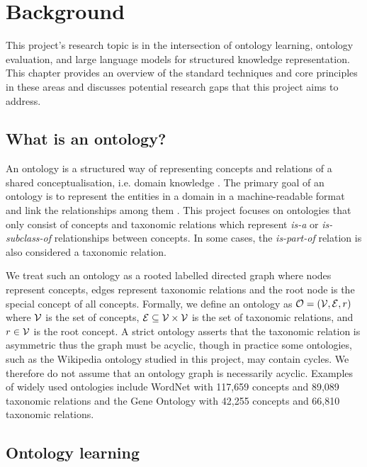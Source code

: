 \chapter{Background}

This project's research topic is in the intersection of ontology learning, ontology evaluation, and large language models for structured knowledge representation. This chapter provides an overview of the standard techniques and core principles in these areas and discusses potential research gaps that this project aims to address.

\section{What is an ontology?}

An ontology is a structured way of representing concepts and relations of a shared conceptualisation, i.e. domain knowledge \cite{gruber1995toward,gruber1993translation}. The primary goal of an ontology is to represent the entities in a domain in a machine-readable format and link the relationships among them \cite{national2022ontologies}. This project focuses on ontologies that only consist of concepts and taxonomic relations which represent \emph{is-a} or \emph{is-subclass-of} relationships between concepts. In some cases, the \emph{is-part-of} relation is also considered a taxonomic relation.

We treat such an ontology as a rooted labelled directed graph where nodes represent concepts, edges represent taxonomic relations and the root node is the special concept of all concepts. Formally, we define an ontology as $\mathcal{O} = (\mathcal{V}, \mathcal{E}, r)$ where $\mathcal{V}$ is the set of concepts, $\mathcal{E} \subseteq \mathcal{V} \times \mathcal{V}$ is the set of taxonomic relations, and $r \in \mathcal{V}$ is the root concept. A strict ontology asserts that the taxonomic relation is asymmetric thus the graph must be acyclic, though in practice some ontologies, such as the Wikipedia ontology studied in this project, may contain cycles. We therefore do not assume that an ontology graph is necessarily acyclic. Examples of widely used ontologies include WordNet \cite{miller1995wordnet} with 117,659 concepts and 89,089 taxonomic relations and the Gene Ontology \cite{ashburner2000gene} with 42,255 concepts and 66,810 taxonomic relations.

\section{Ontology learning}

